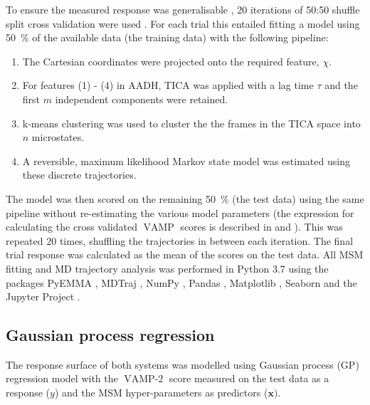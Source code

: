 To ensure the  measured response was generalisable \cite{friedman2001elements}, $20$ iterations of 50:50 shuffle split cross validation were used \cite{husicOptimizedParameterSelection2016}. For each trial this entailed fitting a model using \SI{50}{\percent} of the available data (the training data) with the following pipeline:

\begin{enumerate}
    \item \label{lst:modfititem1} The Cartesian coordinates were projected onto the required feature, $\chi$. 
    \item \label{lst:modfititem2} For features (1) - (4) in AADH, TICA was applied with a lag time $\tau$ and the first $m$ independent  components were retained. 
    \item \label{lst:modfititem3} k-means clustering \cite{friedman2001elements} was used to cluster the the frames in the TICA space into $n$ microstates.
    \item \label{lst:modfititem4} A reversible, maximum likelihood Markov state model was estimated using these discrete trajectories. 
\end{enumerate}

The model was then scored on the remaining \SI{50}{\percent} (the test data) using the same pipeline without re-estimating the various model parameters (the expression for calculating the cross validated $\operatorname{VAMP}$ scores is described in \cite{mcgibbonVariationalCrossvalidationSlow2015} and \cite{wuVariationalApproachLearning2019}). This was repeated $20$ times, shuffling the trajectories in between each iteration.  The final trial response was calculated as the mean of the scores on the test data. All MSM fitting and MD trajectory analysis was performed in Python 3.7 using the packages PyEMMA \cite{schererPyEMMASoftwarePackage2015a}, MDTraj \cite{mcgibbonMDTrajModernOpen2015}, NumPy \cite{waltNumPyArrayStructure2011}, Pandas \cite{mckinneyPandasFoundationalPython2011}, Matplotlib \cite{hunterMatplotlib2DGraphics2007},  Seaborn \cite{michaelwaskomMwaskomSeabornV02020} and the Jupyter Project \cite{kluyverJupyterNotebooksPublishing2016}. 

\subsection{Gaussian process regression}\label{subsec:rsm}
The response surface of both systems was modelled using Gaussian process (GP) regression model with the $\operatorname{VAMP-2}$ score measured on the test data as a response ($y$) and the MSM hyper-parameters as predictors ($\mathbf{x})$. 


